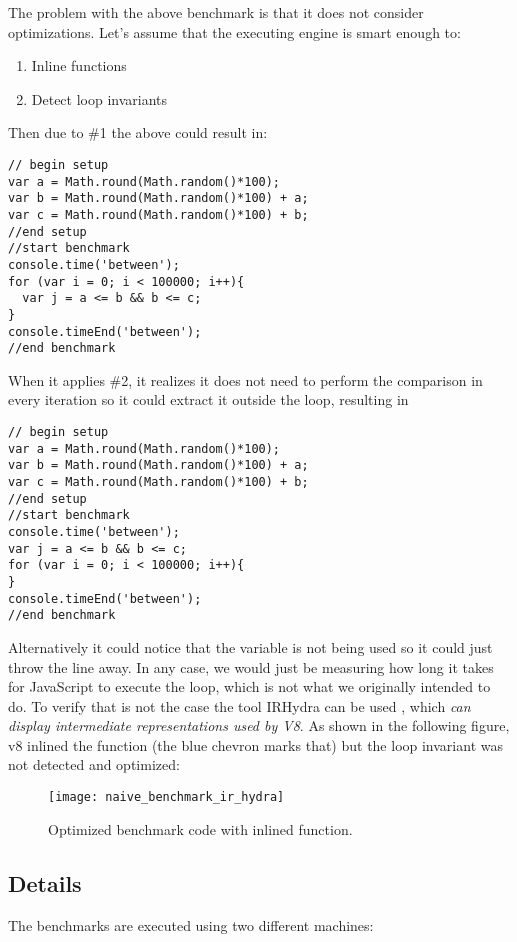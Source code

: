 The problem with the above benchmark is that it does not consider optimizations. Let's assume that the executing engine is smart enough to:
\begin{enumerate}
  \item Inline functions
  \item Detect loop invariants
\end{enumerate}

Then due to \#1 the above could result in:
\begin{lstlisting}[caption=Naive benchmark after inlining]
// begin setup
var a = Math.round(Math.random()*100);
var b = Math.round(Math.random()*100) + a;
var c = Math.round(Math.random()*100) + b;
//end setup
//start benchmark
console.time('between');
for (var i = 0; i < 100000; i++){
  var j = a <= b && b <= c;
}
console.timeEnd('between');
//end benchmark
\end{lstlisting}

When it applies \#2, it realizes it does not need to perform the comparison in every iteration so it could extract it outside the loop, resulting in
\begin{lstlisting}[caption=Naive benchmark after evaluating loop invariants]
// begin setup
var a = Math.round(Math.random()*100);
var b = Math.round(Math.random()*100) + a;
var c = Math.round(Math.random()*100) + b;
//end setup
//start benchmark
console.time('between');
var j = a <= b && b <= c;
for (var i = 0; i < 100000; i++){
}
console.timeEnd('between');
//end benchmark
\end{lstlisting}

Alternatively it could notice that the variable  is not being used so it could just throw the line away. In any case, we would just be measuring how long it takes for JavaScript to execute the loop, which is not what we originally intended to do. To verify that is not the case the tool IRHydra\cite{ir-hydra} can be used , which \textit{can display intermediate representations used by V8}. As shown in the following figure, v8 inlined the function (the blue chevron marks that) but the loop invariant was not detected and optimized:
\begin{figure}[h!]
  \centering
  \texttt{[image: naive\_benchmark\_ir\_hydra]}
  \caption{Optimized benchmark code with inlined function.}
\end{figure}

\subsection{Details}
\label{sub-sec:serialization-and-transference}
The benchmarks are executed using two different machines:

